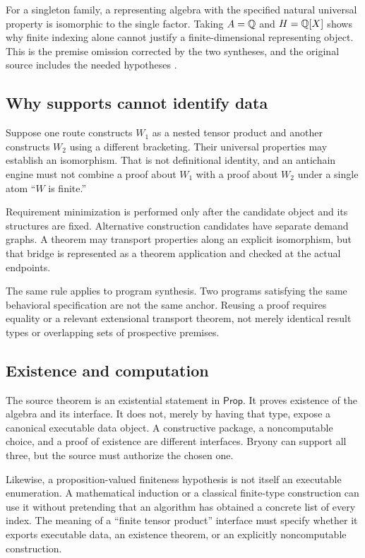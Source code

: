 \documentclass[11pt,a4paper]{article}
\newcommand{\Prop}{\ensuremath{\mathsf{Prop}}}\newcommand{\Req}{\mathsf{Req}}
\theoremstyle{definition}\newtheorem{definition}[theorem]{Definition}
\theoremstyle{remark}\newtheorem{remark}[theorem]{Remark}
\begin{document}
For a singleton family, a representing algebra with the specified natural universal property is isomorphic to the single factor. Taking $A=\mathbb Q$ and $H=\mathbb Q[X]$ shows why finite indexing alone cannot justify a finite-dimensional representing object. This is the premise omission corrected by the two syntheses, and the original source includes the needed hypotheses \cite{synA,synB,tensor}.

\subsection{Why supports cannot identify data}
Suppose one route constructs $W_1$ as a nested tensor product and another constructs $W_2$ using a different bracketing. Their universal properties may establish an isomorphism. That is not definitional identity, and an antichain engine must not combine a proof about $W_1$ with a proof about $W_2$ under a single atom ``$W$ is finite.''

Requirement minimization is performed only after the candidate object and its structures are fixed. Alternative construction candidates have separate demand graphs. A theorem may transport properties along an explicit isomorphism, but that bridge is represented as a theorem application and checked at the actual endpoints.

The same rule applies to program synthesis. Two programs satisfying the same behavioral specification are not the same anchor. Reusing a proof requires equality or a relevant extensional transport theorem, not merely identical result types or overlapping sets of prospective premises.

\subsection{Existence and computation}
The source theorem is an existential statement in \Prop. It proves existence of the algebra and its interface. It does not, merely by having that type, expose a canonical executable data object. A constructive package, a noncomputable choice, and a proof of existence are different interfaces. Bryony can support all three, but the source must authorize the chosen one.

Likewise, a proposition-valued finiteness hypothesis is not itself an executable enumeration. A mathematical induction or a classical finite-type construction can use it without pretending that an algorithm has obtained a concrete list of every index. The meaning of a ``finite tensor product'' interface must specify whether it exports executable data, an existence theorem, or an explicitly noncomputable construction.
\end{document}
